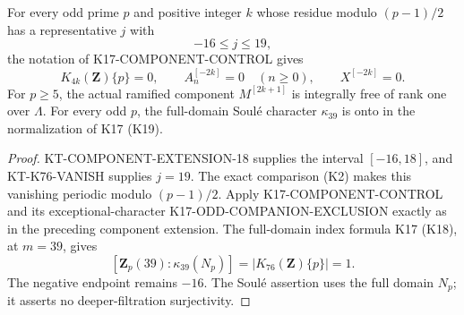 \begin{corollary}
For every odd prime $p$ and positive integer $k$ whose residue
modulo $(p-1)/2$ has a representative $j$ with
\[
                              -16\leq j\leq19,
\]
the notation of K17-COMPONENT-CONTROL gives
\[
 K_{4k}(\mathbf Z)\{p\}=0,\qquad
 A_n^{[-2k]}=0\quad(n\geq0),\qquad X^{[-2k]}=0.
\]
For $p\geq5$, the actual ramified component $M^{[2k+1]}$
is integrally free of rank one over $\Lambda$.
For every odd $p$, the full-domain Soul\'e character
$\kappa_{39}$ is onto in the normalization of K17 (K19).
\end{corollary}
\begin{proof}
KT-COMPONENT-EXTENSION-18 supplies the interval $[-16,18]$,
and KT-K76-VANISH supplies $j=19$.
The exact comparison (K2) makes this vanishing periodic
modulo $(p-1)/2$.  Apply K17-COMPONENT-CONTROL and its
exceptional-character K17-ODD-COMPANION-EXCLUSION exactly
as in the preceding component extension.  The full-domain
index formula K17 (K18), at $m=39$, gives
\[
 [\mathbf Z_p(39):\kappa_{39}(N_p)]
                  =|K_{76}(\mathbf Z)\{p\}|=1.
\]
The negative endpoint remains $-16$.  The Soul\'e assertion
uses the full domain $N_p$; it asserts no deeper-filtration
surjectivity.
\end{proof}
